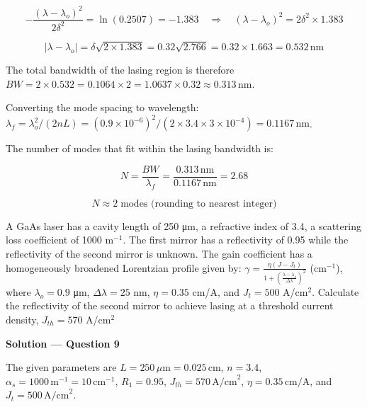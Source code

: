 \begin{equation*}
  -\frac{(\lambda-\lambda_o)^2}{2\delta^2} = \ln(0.2507) = -1.383 \quad\Longrightarrow\quad (\lambda-\lambda_o)^2 = 2\delta^2 \times 1.383
\end{equation*}

\begin{equation*}
  |\lambda - \lambda_o| = \delta\sqrt{2 \times 1.383} = 0.32\sqrt{2.766} = 0.32 \times 1.663 = 0.532\,\text{nm}
\end{equation*}

The total bandwidth of the lasing region is therefore $BW = 2 \times 0.532 = 0.1064 \times 2 = 1.0637 \times 0.32 \approx 0.313\,\text{nm}$.

Converting the mode spacing to wavelength: $\lambda_f = \lambda_o^2 / (2nL) = (0.9\times10^{-6})^2/(2\times3.4\times3\times10^{-4}) = 0.1167\,\text{nm}$.

The number of modes that fit within the lasing bandwidth is:

\begin{equation*}
  N = \frac{BW}{\lambda_f} = \frac{0.313\,\text{nm}}{0.1167\,\text{nm}} = 2.68
\end{equation*}

\begin{equation*}
  \boxed{N \approx 2\;\text{modes (rounding to nearest integer)}}
\end{equation*}

\begin{question}[Question 9]
A GaAs laser has a cavity length of 250 \si{\micro\meter}, a refractive index of 3.4, a scattering loss coefficient of 1000 m$^{-1}$. The first mirror has a reflectivity of 0.95 while the reflectivity of the second mirror is unknown. The gain coefficient has a homogeneously broadened Lorentzian profile given by: $\gamma = \frac{\eta(J - J_t)}{1 + \left(\frac{\lambda - \lambda_o}{\Delta\lambda}\right)^2}$ (cm$^{-1}$), where $\lambda_o = 0.9$ \si{\micro\meter}, $\Delta\lambda = 25$ nm, $\eta = 0.35$ cm/A, and $J_t = 500$ A/cm$^2$. Calculate the reflectivity of the second mirror to achieve lasing at a threshold current density, $J_{th} = 570$ A/cm$^2$
\end{question}

\textbf{\large Solution --- Question 9}

The given parameters are $L = 250\,\mu\text{m} = 0.025\,\text{cm}$, $n = 3.4$, $\alpha_s = 1000\,\text{m}^{-1} = 10\,\text{cm}^{-1}$, $R_1 = 0.95$, $J_{th} = 570\,\text{A/cm}^2$, $\eta = 0.35\,\text{cm/A}$, and $J_t = 500\,\text{A/cm}^2$.

